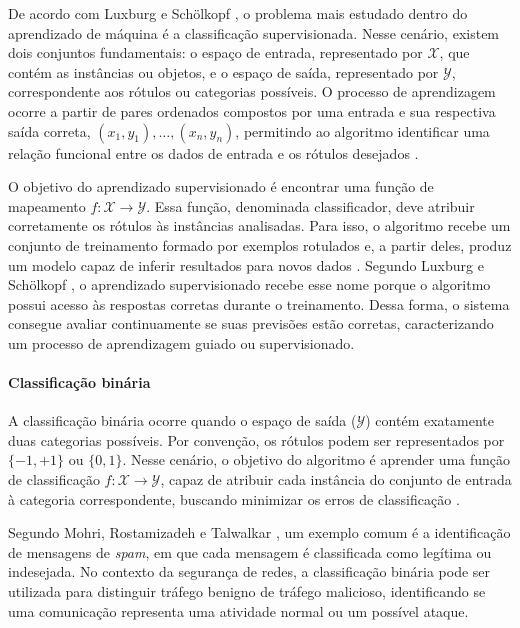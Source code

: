 \documentclass[
    12pt,                %
    openright,           %
    oneside,             %
    a4paper,             %
    english,             %
    brazil               %
]{abntex2}
\begin{document}
De acordo com Luxburg e Schölkopf \cite{luxburg2008}, o problema mais estudado dentro do aprendizado de máquina é a classificação supervisionada. Nesse cenário, existem dois conjuntos fundamentais: o espaço de entrada, representado por $\mathcal{X}$, que contém as instâncias ou objetos, e o espaço de saída, representado por $\mathcal{Y}$, correspondente aos rótulos ou categorias possíveis. O processo de aprendizagem ocorre a partir de pares ordenados compostos por uma entrada e sua respectiva saída correta, $(x_1,y_1),\ldots,(x_n,y_n)$, permitindo ao algoritmo identificar uma relação funcional entre os dados de entrada e os rótulos desejados \cite{luxburg2008}.

O objetivo do aprendizado supervisionado é encontrar uma função de mapeamento $f:\mathcal{X}\rightarrow\mathcal{Y}$. Essa função, denominada classificador, deve atribuir corretamente os rótulos às instâncias analisadas. Para isso, o algoritmo recebe um conjunto de treinamento formado por exemplos rotulados e, a partir deles, produz um modelo capaz de inferir resultados para novos dados \cite{luxburg2008}. Segundo Luxburg e Schölkopf \cite{luxburg2008}, o aprendizado supervisionado recebe esse nome porque o algoritmo possui acesso às respostas corretas durante o treinamento. Dessa forma, o sistema consegue avaliar continuamente se suas previsões estão corretas, caracterizando um processo de aprendizagem guiado ou supervisionado.

\paragraph{Classificação binária}

A classificação binária ocorre quando o espaço de saída ($\mathcal{Y}$) contém exatamente duas categorias possíveis. Por convenção, os rótulos podem ser representados por $\{-1,+1\}$ ou $\{0,1\}$. Nesse cenário, o objetivo do algoritmo é aprender uma função de classificação $f:\mathcal{X}\rightarrow\mathcal{Y}$, capaz de atribuir cada instância do conjunto de entrada à categoria correspondente, buscando minimizar os erros de classificação \cite{vonluxburg2011}.

Segundo Mohri, Rostamizadeh e Talwalkar \cite{mohri2018}, um exemplo comum é a identificação de mensagens de \textit{spam}, em que cada mensagem é classificada como legítima ou indesejada. No contexto da segurança de redes, a classificação binária pode ser utilizada para distinguir tráfego benigno de tráfego malicioso, identificando se uma comunicação representa uma atividade normal ou um possível ataque.
\end{document}

